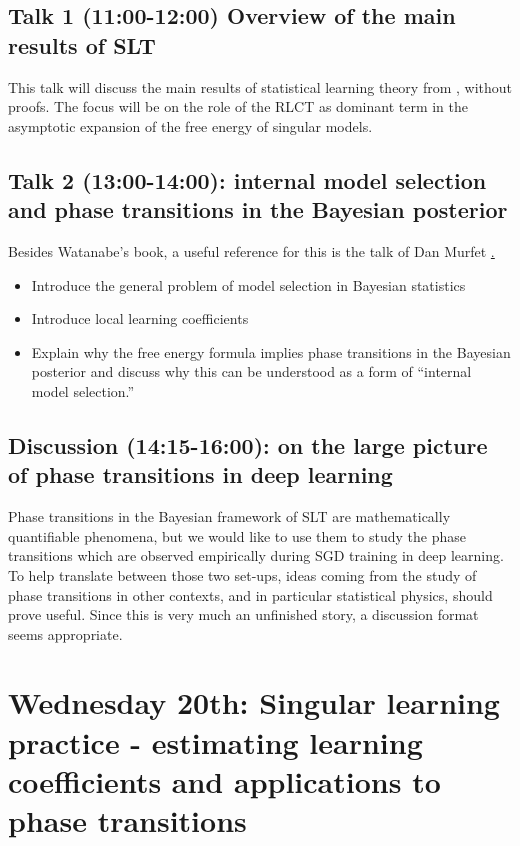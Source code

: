 \documentclass[a4paper,11pt]{amsart}
\begin{document}
\subsection*{Talk 1 (11:00-12:00) Overview of the main results of SLT}

This talk will discuss the main results of statistical learning theory from \cite{grey-book,green-book}, without proofs. The focus will be on the role of the RLCT as dominant term in the asymptotic expansion of the free energy of singular models.

\subsection*{Talk 2 (13:00-14:00): internal model selection and phase transitions in the Bayesian posterior}

Besides Watanabe's book, a useful reference for this is the talk of Dan Murfet \href{https://www.youtube.com/watch?v=UBY7xc1LZ6E&t=4364s}.

\begin{itemize}
\item Introduce the general problem of model selection in Bayesian statistics \cite[\S 8.1]{green-book}
\item Introduce local learning coefficients \cite{lambdahat}
\item Explain why the free energy formula implies phase transitions in the Bayesian posterior and discuss why this can be understood as a form of ``internal model selection.''\cite[\S 7.6]{grey-book} \cite[\S 9.4]{green-book}

\end{itemize}

\subsection*{Discussion (14:15-16:00): on the large picture of phase transitions in deep learning}

Phase transitions in the Bayesian framework of SLT are mathematically quantifiable phenomena, but we would like to use them to study the phase transitions which are observed empirically during SGD training in deep learning. To help translate between those two set-ups, ideas coming from the study of phase transitions in other contexts, and in particular statistical physics, should prove useful. Since this is very much an unfinished story, a discussion format seems appropriate.


\section*{Wednesday 20th: Singular learning practice - estimating learning coefficients and applications to phase transitions}
\end{document}
